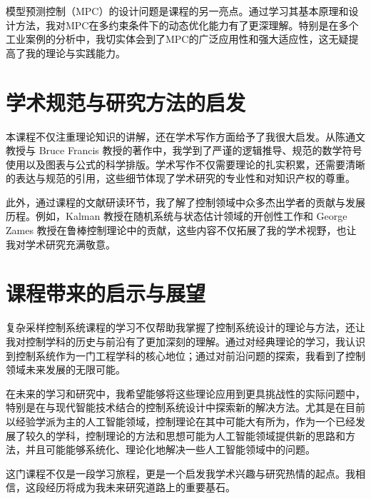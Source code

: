 \documentclass[lang=cn,a4paper,newtx]{elegantpaper}
\begin{document}
模型预测控制（MPC）的设计问题是课程的另一亮点。通过学习其基本原理和设计方法，我对MPC在多约束条件下的动态优化能力有了更深理解。特别是在多个工业案例的分析中，我切实体会到了MPC的广泛应用性和强大适应性，这无疑提高了我的理论与实践能力。

\section{学术规范与研究方法的启发}
本课程不仅注重理论知识的讲解，还在学术写作方面给予了我很大启发。从陈通文教授与 Bruce Francis 教授的著作中，我学到了严谨的逻辑推导、规范的数学符号使用以及图表与公式的科学排版。学术写作不仅需要理论的扎实积累，还需要清晰的表达与规范的引用，这些细节体现了学术研究的专业性和对知识产权的尊重。

此外，通过课程的文献研读环节，我了解了控制领域中众多杰出学者的贡献与发展历程。例如，Kalman 教授在随机系统与状态估计领域的开创性工作和 George Zames 教授在鲁棒控制理论中的贡献，这些内容不仅拓展了我的学术视野，也让我对学术研究充满敬意。

\section{课程带来的启示与展望}
复杂采样控制系统课程的学习不仅帮助我掌握了控制系统设计的理论与方法，还让我对控制学科的历史与前沿有了更加深刻的理解。通过对经典理论的学习，我认识到控制系统作为一门工程学科的核心地位；通过对前沿问题的探索，我看到了控制领域未来发展的无限可能。

在未来的学习和研究中，我希望能够将这些理论应用到更具挑战性的实际问题中，特别是在与现代智能技术结合的控制系统设计中探索新的解决方法。尤其是在目前以经验学派为主的人工智能领域，控制理论在其中可能大有所为，作为一个已经发展了较久的学科，控制理论的方法和思想可能为人工智能领域提供新的思路和方法，并且可能能够系统化、理论化地解决一些人工智能领域中的问题。

这门课程不仅是一段学习旅程，更是一个启发我学术兴趣与研究热情的起点。我相信，这段经历将成为我未来研究道路上的重要基石。

\nocite{*}
\printbibliography[heading=bibintoc, title=\ebibname]

\appendix
\addappheadtotoc
\end{document}
